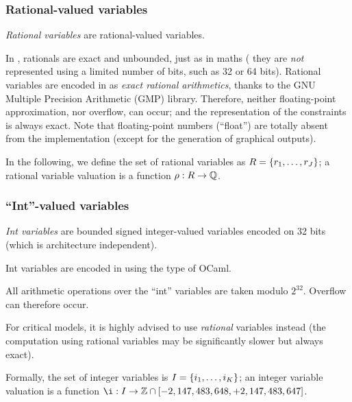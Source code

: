 \subsubsection{Rational-valued variables}

\emph{Rational variables} are rational-valued variables.

In \imitator{}, rationals are exact and unbounded, just as in maths (\ie{} they are \emph{not} represented using a limited number of bits, such as 32 or 64 bits).
%
Rational variables are encoded in \imitator{} as \emph{exact rational arithmetics}, thanks to the GNU Multiple Precision Arithmetic (GMP) library.
Therefore, neither floating-point approximation, nor overflow, can occur;
%
and the representation of the constraints is always exact.
Note that floating-point numbers (``float'') are totally absent from the \imitator{} implementation (except for the generation of graphical outputs).

In the following, we define the set of rational variables as $R = \{ r_1, \dots, r_J \} $;
a rational variable valuation is a function $\rho : R \rightarrow \mathbb Q$.



\subsubsection{``Int''-valued variables}

\emph{Int variables} are bounded signed integer-valued variables encoded on 32 bits (which is architecture independent).

Int variables are encoded in \imitator{} using the  type of OCaml.

\begin{becareful}
	All arithmetic operations over the ``int'' variables are taken modulo $2^{32}$.
	Overflow can therefore occur.

	For critical models, it is highly advised to use \emph{rational} variables instead (the computation using rational variables may be significantly slower but always exact).
\end{becareful}

Formally, the set of integer variables is $I = \{ i_1, \dots, i_K \} $;
an integer variable valuation is a function $\ival : \IVar \rightarrow \setZ \cap \left[-2,147,483,648, +2,147,483,647\right]$.


